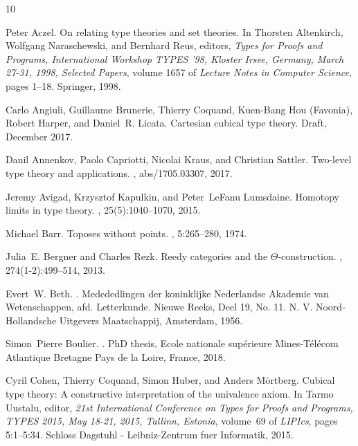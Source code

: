 \documentclass[10pt,a4paper,draft]{article}
\renewcommand{\~}{\widetilde}
\theoremstyle{definition}
\theoremstyle{remark} %
\begin{document}
\begin{thebibliography}{10}

Peter Aczel.
\newblock On relating type theories and set theories.
\newblock In Thorsten Altenkirch, Wolfgang Naraschewski, and Bernhard Reus,
  editors, {\em Types for Proofs and Programs, International Workshop {TYPES}
  '98, Kloster Irsee, Germany, March 27-31, 1998, Selected Papers}, volume 1657
  of {\em Lecture Notes in Computer Science}, pages 1--18. Springer, 1998.

Carlo Angiuli, Guillaume Brunerie, Thierry Coquand, Kuen-Bang {Hou (Favonia)},
  Robert Harper, and Daniel~R. Licata.
\newblock Cartesian cubical type theory.
\newblock Draft, December 2017.

Danil Annenkov, Paolo Capriotti, Nicolai Kraus, and Christian Sattler.
\newblock Two-level type theory and applications.
, abs/1705.03307, 2017.

Jeremy Avigad, Krzysztof Kapulkin, and Peter~LeFanu Lumsdaine.
\newblock Homotopy limits in type theory.
, 25(5):1040--1070, 2015.

Michael Barr.
\newblock Toposes without points.
, 5:265--280, 1974.

Julia~E. Bergner and Charles Rezk.
\newblock Reedy categories and the {$\varTheta$}-construction.
, 274(1-2):499--514, 2013.

Evert~W. Beth.
.
\newblock Medededlingen der koninklijke Nederlandse Akademie van Wetenschappen,
  afd. Letterkunde. Nieuwe Reeks, Deel 19, No. 11. N. V. Noord-Hollandsche
  Uitgevers Maatschappij, Amsterdam, 1956.

Simon~Pierre Boulier.
.
\newblock PhD thesis, Ecole nationale sup\'{e}rieure Mines-T\'{e}l\'{e}com
  Atlantique Bretagne Pays de la Loire, France, 2018.

Cyril Cohen, Thierry Coquand, Simon Huber, and Anders M\"{o}rtberg.
\newblock Cubical type theory: {A} constructive interpretation of the
  univalence axiom.
\newblock In Tarmo Uustalu, editor, {\em 21st International Conference on Types
  for Proofs and Programs, {TYPES} 2015, May 18-21, 2015, Tallinn, Estonia},
  volume~69 of {\em LIPIcs}, pages 5:1--5:34. Schloss Dagstuhl -
  Leibniz-Zentrum fuer Informatik, 2015.


\end{thebibliography}
\end{document}
